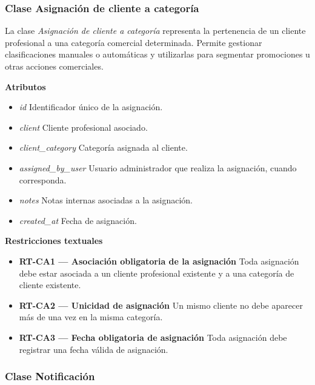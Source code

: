 \subsubsection{Clase Asignación de cliente a categoría}

La clase \textit{Asignación de cliente a categoría} representa la pertenencia de un cliente profesional a una categoría comercial determinada. Permite gestionar clasificaciones manuales o automáticas y utilizarlas para segmentar promociones u otras acciones comerciales.

\textbf{Atributos}

\begin{itemize}

      \item \textit{id}
            Identificador único de la asignación.
      \item \textit{client}
            Cliente profesional asociado.
      \item \textit{client\_category}
            Categoría asignada al cliente.
      \item \textit{assigned\_by\_user}
            Usuario administrador que realiza la asignación, cuando corresponda.
      \item \textit{notes}
            Notas internas asociadas a la asignación.
      \item \textit{created\_at}
            Fecha de asignación.

\end{itemize}

\textbf{Restricciones textuales}

\begin{itemize}

      \item \textbf{RT-CA1 — Asociación obligatoria de la asignación}
            Toda asignación debe estar asociada a un cliente profesional existente y a una categoría de cliente existente.
      \item \textbf{RT-CA2 — Unicidad de asignación}
            Un mismo cliente no debe aparecer más de una vez en la misma categoría.
      \item \textbf{RT-CA3 — Fecha obligatoria de asignación}
            Toda asignación debe registrar una fecha válida de asignación.

\end{itemize}

\subsubsection{Clase Notificación}

